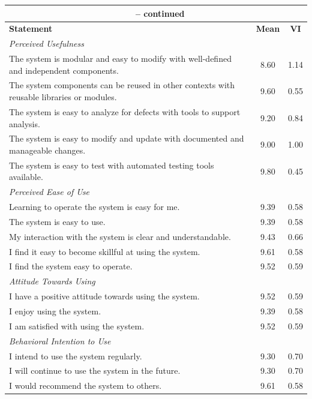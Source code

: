 \begin{appendices}
\begin{centerappendixtitle}
\begin{spacing}{1.3}
\begin{longtable}{p{12cm}cc}
		\multicolumn{3}{c}{{\tablename\ \thetable{} -- continued}} \\
		\hline
		\textbf{Statement} & \textbf{Mean} & \textbf{VI} \\
		\hline
		\endhead
                \multicolumn{2}{l}{\textit{Perceived Usefulness}} \\
                The system is modular and easy to modify with well-defined and independent components.
                & 8.60 & 1.14  \\
                The system components can be reused in other contexts with reusable libraries or modules.
                & 9.60 & 0.55  \\
                The system is easy to analyze for defects with tools to support analysis.
                & 9.20 & 0.84  \\
                The system is easy to modify and update with documented and manageable changes.
                & 9.00 & 1.00  \\
                The system is easy to test with automated testing tools available.
                & 9.80 & 0.45  \\ 
                \hline
                \multicolumn{2}{l}{\textit{Perceived Ease of Use}} \\  
                Learning to operate the system is easy for me.
                & 9.39 & 0.58  \\
                The system is easy to use.
                & 9.39 & 0.58  \\
                My interaction with the system is clear and understandable.
                & 9.43 & 0.66  \\
                I find it easy to become skillful at using the system.
                & 9.61 & 0.58  \\
                I find the system easy to operate.
                & 9.52 & 0.59  \\ 
                \hline
                \multicolumn{2}{l}{\textit{Attitude Towards Using}} \\
                I have a positive attitude towards using the system.
                & 9.52 & 0.59  \\
                I enjoy using the system.
                & 9.39 & 0.58  \\
                I am satisfied with using the system.
                & 9.52 & 0.59  \\ 
                \hline
                \multicolumn{2}{l}{\textit{Behavioral Intention to Use}} \\
                I intend to use the system regularly.
                & 9.30 & 0.70  \\
                I will continue to use the system in the future.
                & 9.30 & 0.70  \\
                I would recommend the system to others.
                & 9.61 & 0.58  \\ \hline
            

\end{longtable}
\end{spacing}
\end{centerappendixtitle}
\end{appendices}
